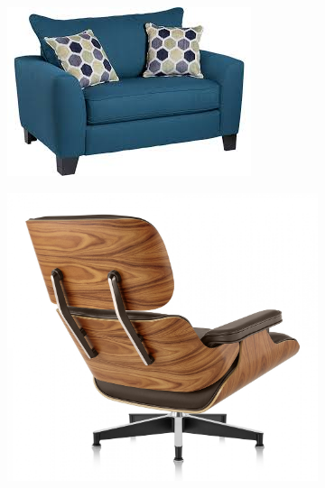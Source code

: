 \begin{figure}[h!]
	\begin{subfigure}[b]{0.2\linewidth}
		\includegraphics[width=\linewidth]{images/chairs/3.jpeg}
	\end{subfigure}
	\begin{subfigure}[b]{0.2\linewidth}
		\includegraphics[width=\linewidth]{images/chairs/4.jpg}
	\end{subfigure}
	\begin{subfigure}[b]{0.2\linewidth}

\end{subfigure}
\end{figure}
